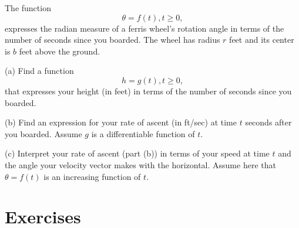 \documentclass{ximera}
\begin{document}
\begin{question}  \label{Q:34e5t4566}
The function
\[
    \theta = f(t) , t \geq 0 ,
\]
expresses the radian measure of a ferris wheel's rotation angle in terms of the number of seconds since you boarded. The wheel has radius $r$ feet and its center is $b$ feet above the ground. 

(a) Find a function
\[
     h = g(t) , t \geq 0,
\]
 that expresses your height (in feet) in terms of the number of seconds since you boarded. 

(b) Find an expression for your rate of ascent (in ft/sec) at time $t$ seconds after you boarded. Assume $g$ is a differentiable function of $t$.

(c) Interpret your rate of ascent (part (b)) in terms of your speed at time $t$ and the angle your velocity vector makes with the horizontal. Assume here that $\theta=f(t)$ is an increasing function of $t$. 
\end{question}



\section*{Exercises}
\end{document}
